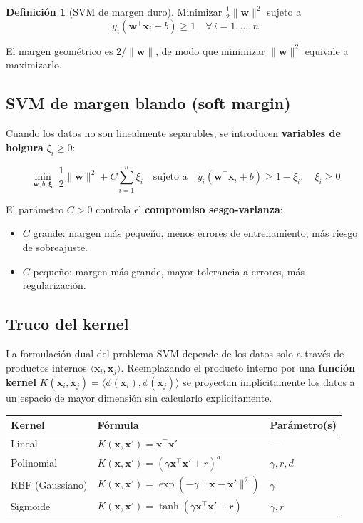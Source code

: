 \documentclass[12pt, a4paper]{article}
\theoremstyle{definition}
\newtheorem{definicion}{Definición}[section]
\theoremstyle{plain}
\theoremstyle{remark}
\newcommand{\bx}{\bm{x}}
\newcommand{\bw}{\bm{w}}
\begin{document}
\begin{definicion}[SVM de margen duro]
  Minimizar $\frac{1}{2}\|\bw\|^2$ sujeto a
  \[
    y_i(\bw^\top \bx_i + b) \geq 1 \quad \forall\, i = 1, \ldots, n
  \]
\end{definicion}

El margen geométrico es $2 / \|\bw\|$, de modo que minimizar $\|\bw\|^2$ equivale a maximizarlo.

\subsection{SVM de margen blando (soft margin)}

Cuando los datos no son linealmente separables, se introducen \textbf{variables de holgura} $\xi_i \geq 0$:

\[
  \min_{\bw, b, \bm{\xi}}\; \frac{1}{2}\|\bw\|^2 + C\sum_{i=1}^{n}\xi_i
  \quad\text{sujeto a}\quad
  y_i(\bw^\top \bx_i + b) \geq 1 - \xi_i,\quad \xi_i \geq 0
\]

El parámetro $C > 0$ controla el \textbf{compromiso sesgo-varianza}:
\begin{itemize}
  \item $C$ grande: margen más pequeño, menos errores de entrenamiento, más riesgo de sobreajuste.
  \item $C$ pequeño: margen más grande, mayor tolerancia a errores, más regularización.
\end{itemize}

\subsection{Truco del kernel}

La formulación dual del problema SVM depende de los datos solo a través de productos internos $\langle \bx_i, \bx_j \rangle$. Reemplazando el producto interno por una \textbf{función kernel} $K(\bx_i, \bx_j) = \langle \phi(\bx_i), \phi(\bx_j) \rangle$ se proyectan implícitamente los datos a un espacio de mayor dimensión sin calcularlo explícitamente.

\begin{center}
\begin{tabular}{lll}
  \toprule
  \textbf{Kernel} & \textbf{Fórmula} & \textbf{Parámetro(s)} \\
  \midrule
  Lineal & $K(\bx, \bx') = \bx^\top \bx'$ & --- \\
  Polinomial & $K(\bx, \bx') = (\gamma\bx^\top\bx' + r)^d$ & $\gamma, r, d$ \\
  RBF (Gaussiano) & $K(\bx, \bx') = \exp(-\gamma\|\bx-\bx'\|^2)$ & $\gamma$ \\
  Sigmoide & $K(\bx, \bx') = \tanh(\gamma\bx^\top\bx' + r)$ & $\gamma, r$ \\
  \bottomrule
\end{tabular}
\end{center}
\end{document}
